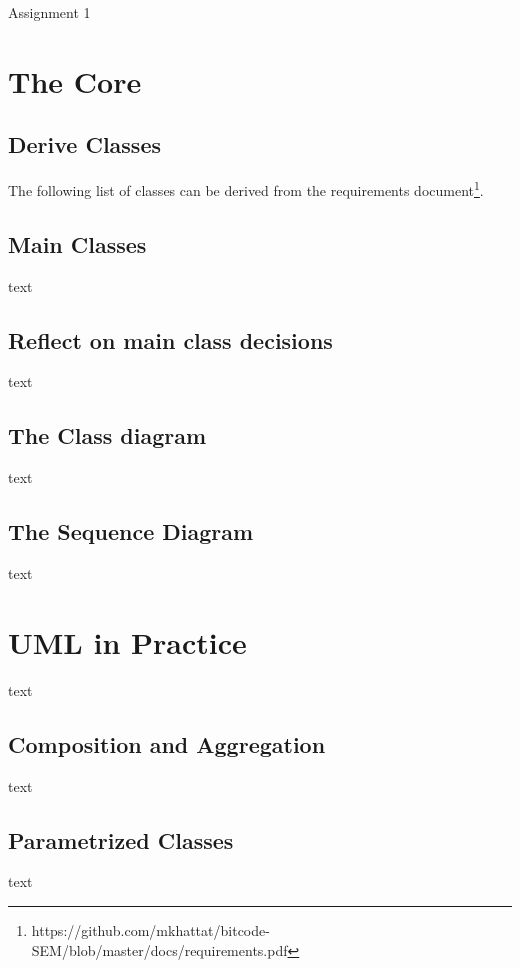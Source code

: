 \documentclass{article}
\begin{document}
\begin{titlepage}
	\Huge{Assignment 1}
\end{titlepage}


\section{The Core}

\subsection{Derive Classes}

The following list of classes can be derived from the requirements document\footnote{https://github.com/mkhattat/bitcode-SEM/blob/master/docs/requirements.pdf}.


\subsection{Main Classes}
text

\subsection{Reflect on main class decisions}
text

\subsection{The Class diagram}
text

\subsection{The Sequence Diagram}
text




\section{UML in Practice}
text

\subsection{Composition and Aggregation}
text

\subsection{Parametrized Classes}
text
\end{document}
